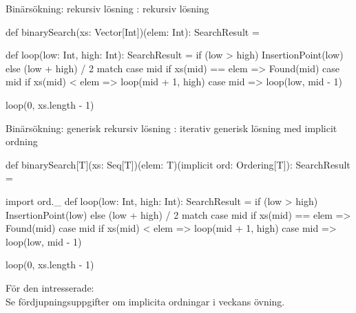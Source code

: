 \begin{Slide}{Binärsökning: rekursiv lösning}
: rekursiv lösning
\begin{Code}[backgroundcolor=\color{white},
  frame=none]
def binarySearch(xs: Vector[Int])(elem: Int): SearchResult = {
  def loop(low: Int, high: Int): SearchResult =
    if (low > high) InsertionPoint(low)
    else (low + high) / 2 match {
      case mid if xs(mid) == elem => Found(mid)
      case mid if xs(mid) < elem  => loop(mid + 1, high)
      case mid                    => loop(low, mid - 1)
    }

  loop(0, xs.length - 1)
}
\end{Code}
\end{Slide}


\begin{Slide}{Binärsökning: generisk rekursiv lösning}
: iterativ generisk lösning med implicit ordning
\begin{CodeSmall}[backgroundcolor=\color{white},
  frame=none]
def binarySearch[T](xs: Seq[T])(elem: T)(implicit ord: Ordering[T]): SearchResult = {
  import ord._
  def loop(low: Int, high: Int): SearchResult =
    if (low > high) InsertionPoint(low)
    else (low + high) / 2 match {
      case mid if xs(mid) == elem => Found(mid)
      case mid if xs(mid) < elem  => loop(mid + 1, high)
      case mid                    => loop(low, mid - 1)
    }

  loop(0, xs.length - 1)
}
\end{CodeSmall}
{\SlideFontSmall För den intresserade:\\Se fördjupningsuppgifter om implicita ordningar i veckans övning.}
\end{Slide}

